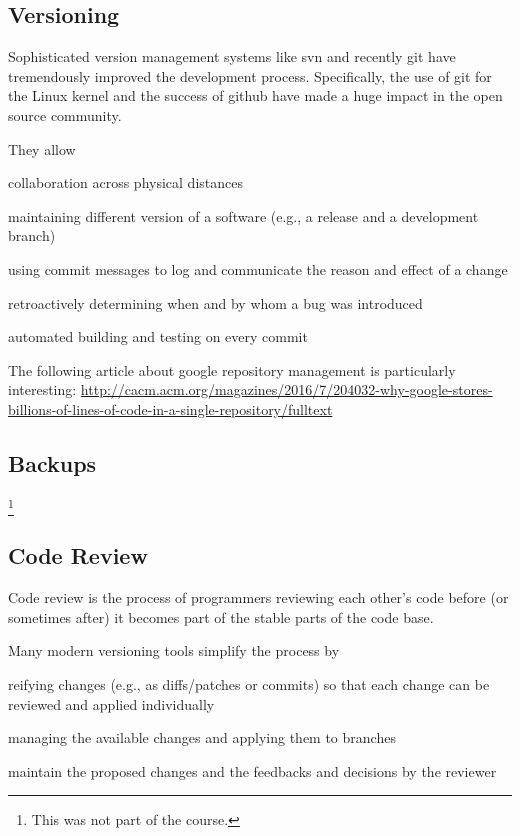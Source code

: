 \subsection{Versioning}

Sophisticated version management systems like svn and recently git have tremendously improved the development process.
Specifically, the use of git for the Linux kernel and the success of github have made a huge impact in the open source community.

They allow
\begin{compactitem}
 \item collaboration across physical distances
 \item maintaining different version of a software (e.g., a release and a development branch)
 \item using commit messages to log and communicate the reason and effect of a change
 \item retroactively determining when and by whom a bug was introduced
 \item automated building and testing on every commit
\end{compactitem}

The following article about google repository management is particularly interesting:
\url{http://cacm.acm.org/magazines/2016/7/204032-why-google-stores-billions-of-lines-of-code-in-a-single-repository/fulltext}

\subsection{Backups}

\footnote{This was not part of the course.}

\subsection{Code Review}

Code review is the process of programmers reviewing each other's code before (or sometimes after) it becomes part of the stable parts of the code base.

Many modern versioning tools simplify the process by
\begin{compactitem}
 \item reifying changes (e.g., as diffs/patches or commits) so that each change can be reviewed and applied individually
 \item managing the available changes and applying them to branches
 \item maintain the proposed changes and the feedbacks and decisions by the reviewer
\end{compactitem}

